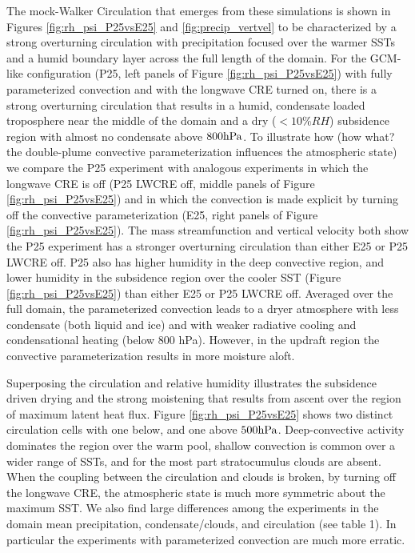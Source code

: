 \documentclass[11pt]{article}   	%
\begin{document}
The mock-Walker Circulation that emerges from these simulations is shown in Figures \ref{fig:rh_psi_P25vsE25} and 
\ref{fig:precip_vertvel} to be characterized by a strong overturning circulation with precipitation focused over the warmer 
SSTs and a humid boundary layer across the full length of the domain.   For the GCM-like configuration (P25, left panels 
of Figure \ref{fig:rh_psi_P25vsE25}) with fully parameterized convection and with the longwave CRE turned on, there is 
a strong overturning circulation that results in a humid, condensate loaded troposphere near the middle of the domain 
and a dry ($< 10\% RH$) subsidence region with almost no condensate above $800 \rm{hPa}$.    
To illustrate how (how what?  the double-plume convective parameterization influences the atmospheric state) 
we compare the P25 experiment with analogous experiments in which the longwave CRE is off (P25 LWCRE off, middle 
panels of Figure \ref{fig:rh_psi_P25vsE25}) and in which the convection is made explicit by turning off the convective 
parameterization (E25, right panels of Figure \ref{fig:rh_psi_P25vsE25}).  
The mass streamfunction and vertical velocity both show the P25 experiment has a stronger overturning circulation 
than either E25 or P25 LWCRE off.  P25 also has higher humidity in the deep convective region, and lower humidity in 
the subsidence region over the 
cooler SST (Figure \ref{fig:rh_psi_P25vsE25}) than either E25 or P25 LWCRE off.  Averaged over the full domain, 
the parameterized convection leads to a dryer atmosphere with less 
condensate (both liquid and ice) and with weaker radiative cooling and condensational heating (below 800 hPa).  However, in 
the updraft region the convective parameterization results in more moisture aloft.      

Superposing the circulation and relative humidity illustrates the subsidence driven 
drying and the strong moistening that results from ascent over the region of maximum latent heat flux.  
Figure \ref{fig:rh_psi_P25vsE25} shows two distinct circulation cells with one below, and one above $500 \rm{hPa}$.  Deep-convective activity dominates the 
region over the warm pool, shallow convection is common over a wider range of SSTs, and for the most part stratocumulus 
clouds are absent.  When the coupling between the circulation and clouds is broken, by turning off the longwave CRE, the atmospheric 
state is much more symmetric about the maximum SST.  
We also find large differences among the experiments in the domain mean precipitation, condensate/clouds, and 
circulation (see table 1).  In particular
the experiments with parameterized convection are much more erratic.   
\end{document}
